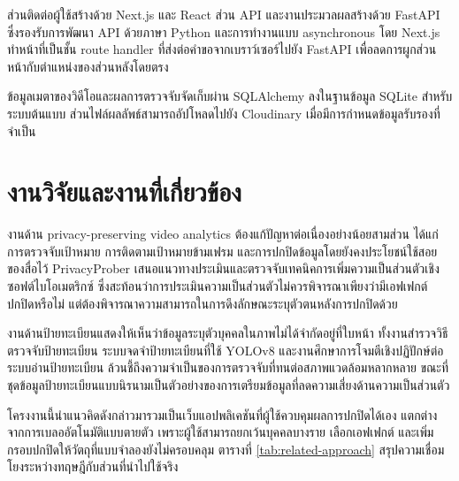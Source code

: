 ส่วนติดต่อผู้ใช้สร้างด้วย Next.js และ React ส่วน API และงานประมวลผลสร้างด้วย FastAPI ซึ่งรองรับการพัฒนา API ด้วยภาษา Python และการทำงานแบบ asynchronous โดย Next.js ทำหน้าที่เป็นชั้น route handler ที่ส่งต่อคำขอจากเบราว์เซอร์ไปยัง FastAPI เพื่อลดการผูกส่วนหน้ากับตำแหน่งของส่วนหลังโดยตรง \cite{fastapi}

ข้อมูลเมตาของวิดีโอและผลการตรวจจับจัดเก็บผ่าน SQLAlchemy ลงในฐานข้อมูล SQLite สำหรับระบบต้นแบบ ส่วนไฟล์ผลลัพธ์สามารถอัปโหลดไปยัง Cloudinary เมื่อมีการกำหนดข้อมูลรับรองที่จำเป็น

\section{งานวิจัยและงานที่เกี่ยวข้อง}

งานด้าน privacy-preserving video analytics ต้องแก้ปัญหาต่อเนื่องอย่างน้อยสามส่วน ได้แก่ การตรวจจับเป้าหมาย การติดตามเป้าหมายข้ามเฟรม และการปกปิดข้อมูลโดยยังคงประโยชน์ใช้สอยของสื่อไว้ PrivacyProber เสนอแนวทางประเมินและตรวจจับเทคนิคการเพิ่มความเป็นส่วนตัวเชิงซอฟต์ไบโอเมตริกซ์ ซึ่งสะท้อนว่าการประเมินความเป็นส่วนตัวไม่ควรพิจารณาเพียงว่ามีเอฟเฟกต์ปกปิดหรือไม่ แต่ต้องพิจารณาความสามารถในการดึงลักษณะระบุตัวตนหลังการปกปิดด้วย \cite{rot2022}

งานด้านป้ายทะเบียนแสดงให้เห็นว่าข้อมูลระบุตัวบุคคลในภาพไม่ได้จำกัดอยู่ที่ใบหน้า ทั้งงานสำรวจวิธีตรวจจับป้ายทะเบียน ระบบจดจำป้ายทะเบียนที่ใช้ YOLOv8 และงานศึกษาการโจมตีเชิงปฏิปักษ์ต่อระบบอ่านป้ายทะเบียน ล้วนชี้ถึงความจำเป็นของการตรวจจับที่ทนต่อสภาพแวดล้อมหลากหลาย ขณะที่ชุดข้อมูลป้ายทะเบียนแบบนิรนามเป็นตัวอย่างของการเตรียมข้อมูลที่ลดความเสี่ยงด้านความเป็นส่วนตัว \cite{iiieta_anpr,mdpi_anpr,vizcarra2024,anpr_dataset}

โครงงานนี้นำแนวคิดดังกล่าวมารวมเป็นเว็บแอปพลิเคชันที่ผู้ใช้ควบคุมผลการปกปิดได้เอง แตกต่างจากการเบลออัตโนมัติแบบตายตัว เพราะผู้ใช้สามารถยกเว้นบุคคลบางราย เลือกเอฟเฟกต์ และเพิ่มกรอบปกปิดให้วัตถุที่แบบจำลองยังไม่ครอบคลุม ตารางที่ \ref{tab:related-approach} สรุปความเชื่อมโยงระหว่างทฤษฎีกับส่วนที่นำไปใช้จริง

